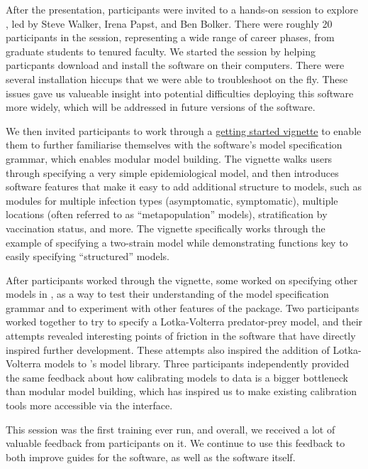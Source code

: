 After the presentation, participants were invited to a hands-on session to explore \newline \macpan, led by Steve Walker, Irena Papst, and Ben Bolker. There were roughly 20 participants in the session, representing a wide range of career phases, from graduate students to tenured faculty. We started the session by helping particpants download and install the software on their computers. There were several installation hiccups that we were able to troubleshoot on the fly. These issues gave us valueable insight into potential difficulties deploying this software more widely, which will be addressed in future versions of the software.

We then invited participants to work through a \href{https://github.com/canmod/macpan2/blob/4b9812d4b05f3e959f2f84f4712d72a681b06e6c/vignettes/quickstart.Rmd}{getting started vignette} to enable them to further familiarise themselves with the software's model specification grammar, which enables modular model building. The vignette walks users through specifying a very simple epidemiological model, and then introduces software features that make it easy to add additional structure to models, such as modules for multiple infection types (\eg asymptomatic, symptomatic), multiple locations (often referred to as ``metapopulation'' models), stratification by vaccination status, and more. The vignette specifically works through the example of specifying a two-strain model while demonstrating \macpan functions key to easily specifying ``structured'' models.

After participants worked through the vignette, some worked on specifying other models in \macpan, as a way to test their understanding of the model specification grammar and to experiment with other features of the package. Two participants worked together to try to specify a Lotka-Volterra predator-prey model, and their attempts revealed interesting points of friction in the software that have directly inspired further development. These attempts also inspired the addition of Lotka-Volterra models to \macpan's model library. Three participants independently provided the same feedback about how calibrating models to data is a bigger bottleneck than modular model building, which has inspired us to make existing calibration tools more accessible via the \macpan interface.

This session was the first \macpan training ever run, and overall, we received a lot of valuable feedback from participants on it. We continue to use this feedback to both improve guides for the software, as well as the software itself.